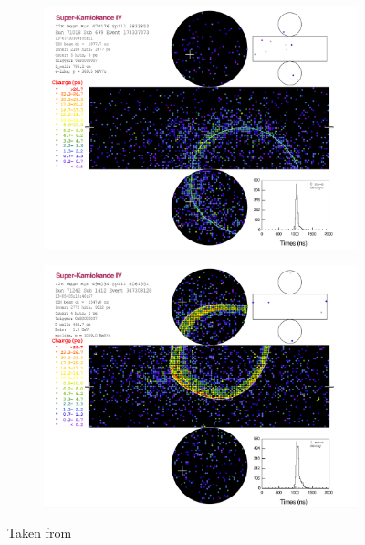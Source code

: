 \begin{figure}[h]
  \begin{subfigure}[t]{0.5\textwidth}
    \includegraphics[width=\textwidth, trim={0mm 0mm 0mm 0mm}, clip,page=1]{Figures/Selections/NuECandidate.pdf}
  \end{subfigure}%
  \begin{subfigure}[t]{0.5\textwidth}
    \includegraphics[width=\textwidth, trim={0mm 0mm 0mm 0mm}, clip,page=1]{Figures/Selections/NuMuCandidate.pdf}
    \subcaption{\quickmath{\nu_{\mu}}}
  \end{subfigure}
  \caption{Taken from }
  \label{fig:Selection_SKEventDisplays}
\end{figure}

